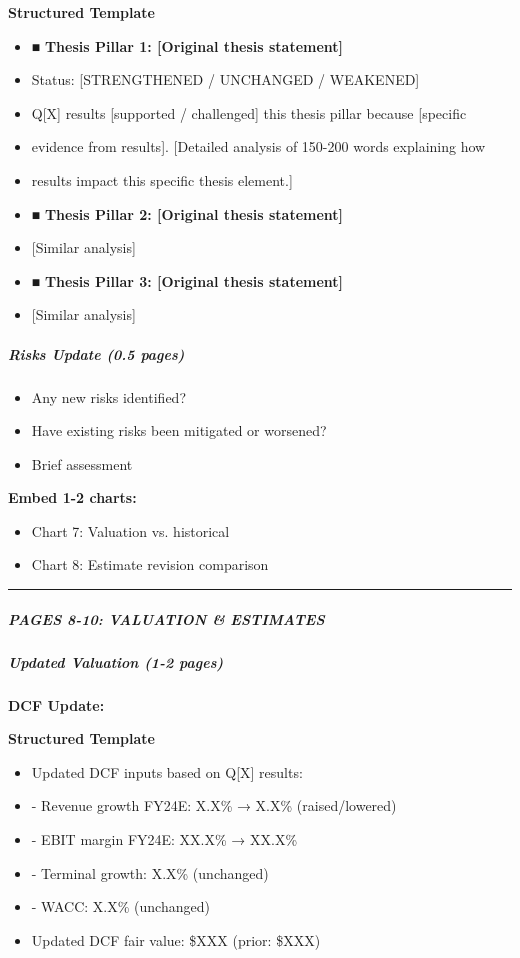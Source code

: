 \documentclass[11pt]{article}
\begin{document}
\textbf{Structured Template}
\begin{itemize}[leftmargin=*,itemsep=2pt,topsep=2pt]
\item {} ■ \textbf{Thesis Pillar 1: [Original thesis statement]}
\item {} Status: [STRENGTHENED / UNCHANGED / WEAKENED]
\item {} Q[X] results [supported / challenged] this thesis pillar because [specific
\item {} evidence from results]. [Detailed analysis of 150-200 words explaining how
\item {} results impact this specific thesis element.]
\item {} ■ \textbf{Thesis Pillar 2: [Original thesis statement]}
\item {} [Similar analysis]
\item {} ■ \textbf{Thesis Pillar 3: [Original thesis statement]}
\item {} [Similar analysis]
\end{itemize}

\subparagraph{Risks Update (0.5 pages)}\mbox{}\par
\begin{itemize}[leftmargin=*,itemsep=2pt,topsep=2pt]
\item {} Any new risks identified?
\item {} Have existing risks been mitigated or worsened?
\item {} Brief assessment
\end{itemize}

\textbf{Embed 1-2 charts:}

\begin{itemize}[leftmargin=*,itemsep=2pt,topsep=2pt]
\item {} Chart 7: Valuation vs. historical
\item {} Chart 8: Estimate revision comparison
\end{itemize}

\vspace{0.5em}\hrule\vspace{0.5em}

\subparagraph{PAGES 8-10: VALUATION \& ESTIMATES}\mbox{}\par

\subparagraph{Updated Valuation (1-2 pages)}\mbox{}\par

\textbf{DCF Update:}

\textbf{Structured Template}
\begin{itemize}[leftmargin=*,itemsep=2pt,topsep=2pt]
\item {} Updated DCF inputs based on Q[X] results:
\item {} - Revenue growth FY24E: X.X\% → X.X\% (raised/lowered)
\item {} - EBIT margin FY24E: XX.X\% → XX.X\%
\item {} - Terminal growth: X.X\% (unchanged)
\item {} - WACC: X.X\% (unchanged)
\item {} Updated DCF fair value: \$XXX (prior: \$XXX)
\end{itemize}
\end{document}

